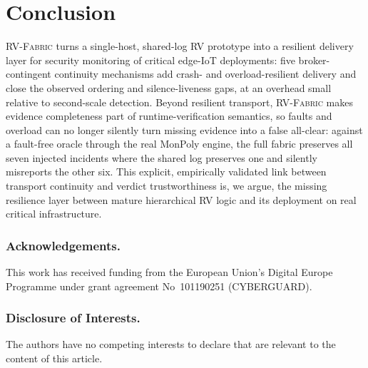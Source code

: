 \documentclass[runningheads]{llncs}
\newcommand{\sys}{\textsc{RV-Fabric}\xspace}
\begin{document}
\section{Conclusion}
\label{sec:conclusion}
\sys turns a single-host, shared-log RV prototype into a resilient delivery layer for
security monitoring of critical edge-IoT deployments: five broker-contingent continuity
mechanisms add crash- and overload-resilient delivery and close the observed ordering and
silence-liveness gaps, at an overhead small relative to second-scale detection. Beyond
resilient transport, \sys makes evidence completeness part of runtime-verification
semantics, so faults and overload can no longer silently turn missing evidence into a false
all-clear: against a fault-free oracle through the real MonPoly engine, the full fabric
preserves all seven injected incidents where the shared log preserves one and silently
misreports the other six. This explicit, empirically validated link between transport
continuity and verdict trustworthiness is, we argue, the missing resilience layer between
mature hierarchical RV logic and its deployment on real critical infrastructure.

\subsubsection*{Acknowledgements.}
This work has received funding from the European Union's Digital Europe Programme under
grant agreement No~101190251 (CYBERGUARD).

{\small
\subsubsection*{Disclosure of Interests.}
The authors have no competing interests to declare that are relevant to the content of
this article.
}



\end{document}
